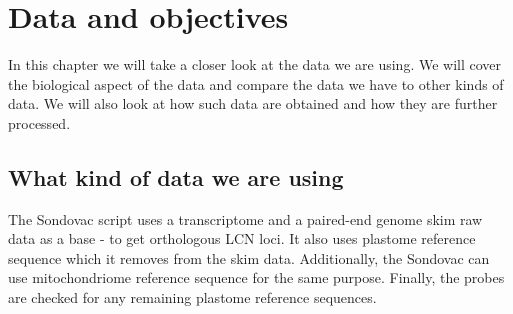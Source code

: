\chapter[Data and objectives]{Data and objectives}
\label{kap:data_and_objectives}

In this chapter we will take a closer look at the data we are using. We will cover the biological aspect of 
the data and compare the data we have to other kinds of data. We will also look at how such data are obtained 
and how they are further processed. 

\section{What kind of data we are using}
The Sondovac script uses a transcriptome and a paired-end genome skim raw data as a base - to get orthologous LCN loci. 
It also uses plastome reference sequence which it removes from the skim data. Additionally, the Sondovac can use mitochondriome 
reference sequence for the same purpose. Finally, the probes are checked for any remaining plastome reference sequences. 
\cite{sondovac}


